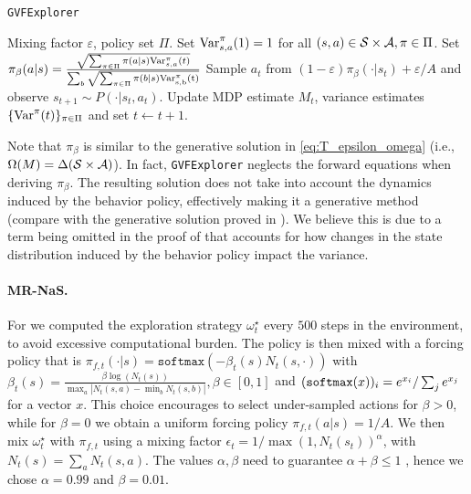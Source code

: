 \begin{algorithm}[h]
	\caption{{\tt GVFExplorer}}
	\label{algo:gvf}
    \small
	\begin{algorithmic}[1]
    \REQUIRE Mixing factor $\varepsilon$, policy set $\Pi$.
    \STATE Set ${\rm Var}_{s,a}^\pi(1)=1$ for all $(s,a)\in {\cal S}\times{\cal A}, \pi\in \Pi$.
            \STATE Set $\pi_\beta(a|s) = \frac{\sqrt{\sum_{\pi\in\Pi} \pi(a|s)  {\rm Var}_{s,a}^\pi(t)}}{\sum_b\sqrt{\sum_{\pi\in\Pi} \pi(b|s)  \rm Var_{s,b}^\pi(t)}}$
            \STATE Sample $a_t$ from $(1-\varepsilon) \pi_\beta(\cdot|s_t)  +\varepsilon/A$ and observe $s_{t+1}\sim P(\cdot|s_t,a_t)$.
            \STATE Update MDP estimate $M_t$, variance estimates $\{{\rm Var}^\pi(t)\}_{\pi\in \Pi}$ and set $t\gets t+1$.
            \ENDWHILE{}
	\end{algorithmic}
\end{algorithm}
Note that $\pi_\beta$ is similar to the generative solution in \cref{eq:T_epsilon_omega} (i.e., $\Omega(M)=\Delta({\cal S}\times{\cal A})$). In fact, {\tt GVFExplorer}  neglects the forward equations when deriving $\pi_\beta$. The resulting solution does not take into account the dynamics induced by the behavior policy, effectively making it a generative method (compare with the generative solution proved in \cite{al2021adaptive,russo2023model}). We believe this is due to a term being omitted  in the proof of \citet[Theorem 4.1]{jain2024adaptive}  that accounts for how changes in the state distribution induced by the behavior policy impact the variance. 
  

\paragraph{MR-NaS.} For \mrnas{} we computed the exploration strategy $\omega_t^\star$ every $500$ steps in the environment, to avoid excessive computational burden.
The policy is then mixed with a forcing policy that is $\pi_{f,t}(\cdot|s)=\texttt{softmax}\left(-\beta_t(s) N_t(s,\cdot)\right)$
with $\beta_t(s) = \frac{\beta  \log(N_t(s))}{\max_a |N_t(s,a) - \min_b N_t(s,b)|}, \beta\in [0,1]$ and  $({\tt softmax}(x))_i=e^{x_i}/\sum_j e^{x_j}$ for a vector $x$. This choice encourages to select under-sampled actions for $\beta > 0$, while for $\beta=0$ we obtain a uniform forcing policy $\pi_{f,t}(a|s)=1/A$. 
 We then mix $\omega_t^\star$ with $\pi_{f,t}$ using a mixing factor $\epsilon_t = 1/\max(1,N_t(s_t))^\alpha$, with $N_t(s) = \sum_a N_t(s,a)$. The values $\alpha,\beta$ need to guarantee $\alpha+\beta\leq 1$ \cite{russomulti}, hence we chose $\alpha=0.99$ and $\beta=0.01$.

